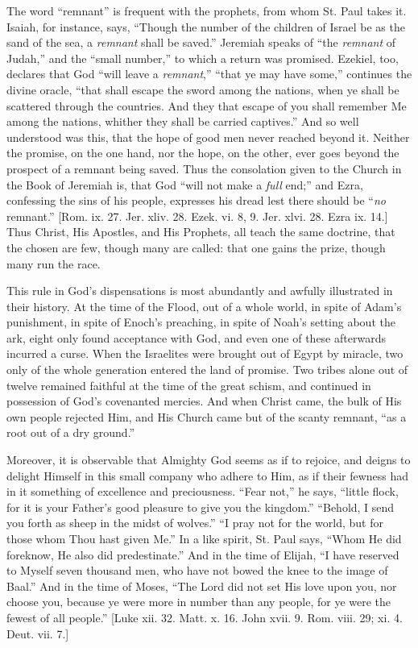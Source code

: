 The word ``remnant'' is frequent with the prophets, from
whom St. Paul takes it. Isaiah, for instance, says, ``Though the
number of the children of Israel be as the sand of the sea, a \emph{remnant}
shall be saved.'' Jeremiah speaks of ``the \emph{remnant} of
Judah,'' and the ``small number,'' to which a return was
promised. Ezekiel, too, declares that God ``will leave a \emph{remnant},''
``that ye may have some,'' continues the divine oracle,
``that shall escape the sword among the nations, when ye shall be
scattered through the countries. And they that escape of you shall
remember Me among the nations, whither they shall be carried
captives.'' And so well understood was this, that the hope of good
men never reached beyond it. Neither the promise, on the one hand, nor
the hope, on the other, ever goes beyond the prospect of a remnant
being saved. Thus the consolation given to the Church in the Book of
Jeremiah is, that God ``will not make a \emph{full} end;'' and
Ezra, confessing the sins of his people, expresses his dread lest
there should be ``\emph{no} remnant.'' [Rom. ix. 27. Jer. xliv.
28. Ezek. vi. 8, 9. Jer. xlvi. 28. Ezra ix. 14.] Thus Christ, His
Apostles, and His Prophets, all teach the same doctrine, that the
chosen are few, though many are called: that one gains the prize,
though many run the race.

This rule in God's dispensations is most abundantly and awfully
illustrated in their history. At the time of the Flood, out of a whole
world, in spite of Adam's punishment, in spite of Enoch's preaching,
in spite of Noah's setting about the ark, eight only found acceptance
with God, and even one of these afterwards incurred a curse. When the
Israelites were brought out of Egypt by miracle, two only of the whole
generation entered the land of promise. Two tribes alone out of twelve
remained faithful at the time of the great schism, and continued in
possession of God's covenanted mercies. And when Christ came, the bulk
of His own people rejected Him, and His Church came but of the scanty
remnant, ``as a root out of a dry ground.''

Moreover, it is observable that Almighty God seems as if to
rejoice, and deigns to delight Himself in this small company who
adhere to Him, as if their fewness had in it something of excellence
and preciousness. ``Fear not,'' he says, ``little flock,
for it is your Father's good pleasure to give you the kingdom.''
``Behold, I send you forth as sheep in the midst of wolves.''
``I pray not for the world, but for those whom Thou hast given
Me.'' In a like spirit, St. Paul says, ``Whom He did foreknow,
He also did predestinate.'' And in the time of Elijah, ``I
have reserved to Myself seven thousand men, who have not bowed the
knee to the image of Baal.'' And in the time of Moses, ``The
Lord did not set His love upon you, nor choose you, because ye were
more in number than any people, for ye were the fewest of all
people.'' [Luke xii. 32. Matt. x. 16. John xvii. 9. Rom. viii. 29;
xi. 4. Deut. vii. 7.]

